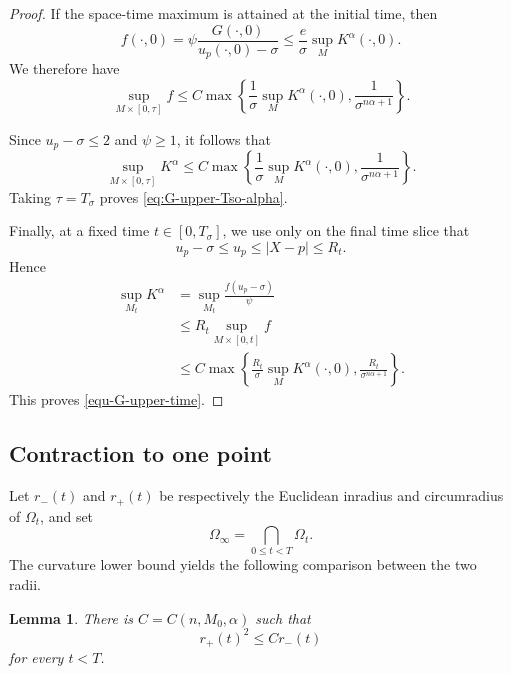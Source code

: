 \documentclass[11pt, reqno]{amsart}
\newtheorem{lemma}[theorem]{Lemma}
\theoremstyle{remark}
\theoremstyle{definition}
\numberwithin{equation}{section}
\begin{document}
\begin{proof}
If the space-time maximum is attained at the initial time, then
\begin{equation*}
    f(\cdot,0)
    =\psi\frac{G(\cdot,0)}{u_p(\cdot,0)-\sigma}
    \leq
    \frac{e}{\sigma}\sup_M K^\alpha(\cdot,0).
\end{equation*}
We therefore have
\begin{equation*}
    \sup_{M\times[0,\tau]}f
    \leq
    C\max\left\{
    \frac{1}{\sigma}\sup_M K^\alpha(\cdot,0),
    \frac{1}{\sigma^{n\alpha+1}}
    \right\}.
\end{equation*}

Since $u_p-\sigma\leq2$ and $\psi\geq1$, it follows that
\begin{equation*}
    \sup_{M\times[0,\tau]}K^\alpha
    \leq
    C\max\left\{
    \frac{1}{\sigma}\sup_M K^\alpha(\cdot,0),
    \frac{1}{\sigma^{n\alpha+1}}
    \right\}.
\end{equation*}
Taking $\tau=T_\sigma$ proves \eqref{eq:G-upper-Tso-alpha}.

Finally, at a fixed time $t\in[0,T_\sigma]$, we use only on the
final time slice that
\begin{equation*}
    u_p-\sigma\leq u_p
    \leq |X-p|\leq R_t.
\end{equation*}
Hence
\begin{align*}
    \sup_{M_t}K^\alpha
    &=
    \sup_{M_t}\frac{f(u_p-\sigma)}{\psi} \\
    &\leq
    R_t\sup_{M\times[0,t]}f \\
    &\leq
    C\max\left\{
    \frac{R_t}{\sigma}\sup_M K^\alpha(\cdot,0),
    \frac{R_t}{\sigma^{n\alpha+1}}
    \right\}.
\end{align*}
This proves \eqref{equ-G-upper-time}.
\end{proof}


\subsection{Contraction to one point}
Let $r_-(t)$ and $r_+(t)$ be respectively the Euclidean inradius and
circumradius of $\Omega_t$, and set
\begin{equation*}
        \Omega_\infty = \bigcap_{0\le t<T}\Omega_t.
\end{equation*}
The curvature lower bound yields the following comparison between the two radii.

\begin{lemma}\label{lem:radius-comparison-alpha}
There is $C=C(n,M_0,\alpha)$ such that
\begin{equation}\label{eq:radius-comparison-alpha}
        r_+(t)^2\le Cr_-(t)
\end{equation}
for every $t<T$.
\end{lemma}
\end{document}

